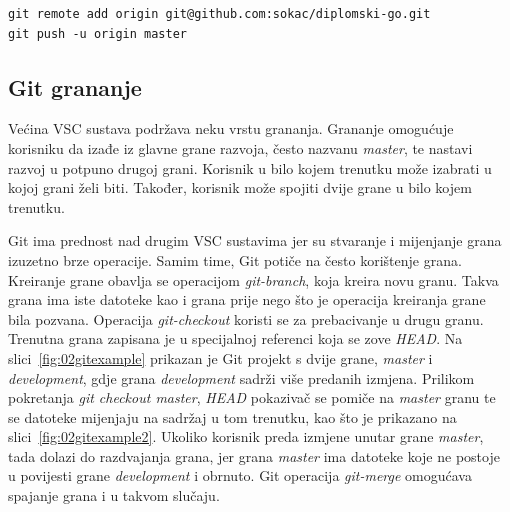 \begin{minipage}{\linewidth}
\begin{lstlisting}
git remote add origin git@github.com:sokac/diplomski-go.git
git push -u origin master
\end{lstlisting}
\end{minipage}

\subsection{Git grananje}
Većina VSC sustava podržava neku vrstu grananja. Grananje omogućuje korisniku da izađe iz glavne
grane razvoja, često nazvanu \textit{master}, te nastavi razvoj u potpuno drugoj grani. Korisnik u
bilo kojem trenutku može izabrati u kojoj grani želi biti. Također, korisnik može spojiti dvije
grane u bilo kojem trenutku.

Git ima prednost nad drugim VSC sustavima jer su stvaranje i mijenjanje grana izuzetno brze
operacije. Samim time, Git potiče na često korištenje grana. Kreiranje grane obavlja se operacijom
\textit{git-branch}, koja kreira novu granu. Takva grana ima iste datoteke kao i grana prije nego
što je operacija kreiranja grane bila pozvana. Operacija \textit{git-checkout} koristi se za
prebacivanje u drugu granu. Trenutna grana zapisana je u specijalnoj referenci koja se zove
\textit{HEAD}. Na slici~\ref{fig:02gitexample} prikazan je Git projekt s dvije grane,
\textit{master} i \textit{development}, gdje grana \textit{development} sadrži više predanih
izmjena. Prilikom pokretanja \textit{git checkout master}, \textit{HEAD} pokazivač se pomiče na
\textit{master} granu te se datoteke mijenjaju na sadržaj u tom trenutku, kao što je prikazano na
slici~\ref{fig:02gitexample2}. Ukoliko korisnik preda izmjene unutar grane \textit{master}, tada
dolazi do razdvajanja grana, jer grana \textit{master} ima datoteke koje ne postoje u povijesti
grane \textit{development} i obrnuto. Git operacija \textit{git-merge} omogućava spajanje grana i u
takvom slučaju.

